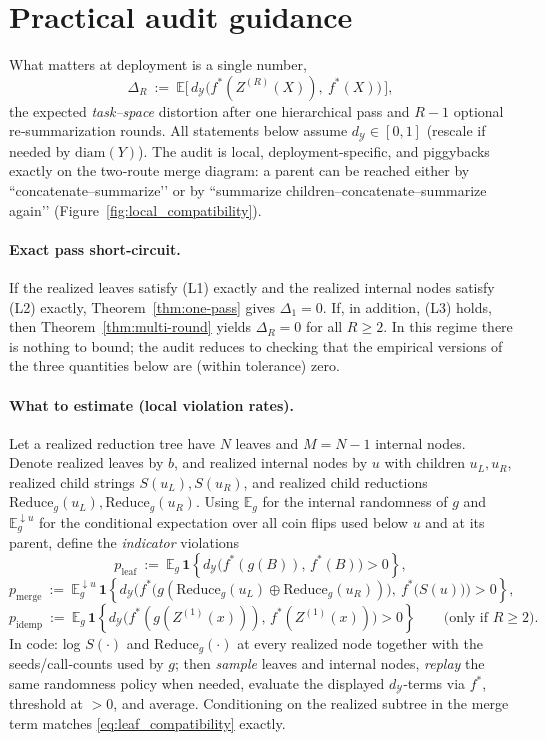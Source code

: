 \documentclass[11pt]{article}
\newcommand{\Y}{\mathcal{Y}}               %
\newcommand{\fstar}{f^*}               %
\newcommand{\E}{\mathbb{E}}
\newcommand{\concat}{\oplus}                    %
\newcommand{\metric}{d_{\Y}}
\newcommand{\reduce}{\text{Reduce}}
\newcommand{\reduceg}{\reduce_g}
\newcommand{\Eg}{\E_g}     %
\begin{document}
\section{Practical audit guidance}\label{sec:audit}

What matters at deployment is a single number,
\[
\Delta_R\ :=\ \E\Big[\,\metric\big(\fstar(Z^{(R)}(X)),\ \fstar(X)\big)\,\Big],
\]
the expected \emph{task–space} distortion after one hierarchical pass and $R-1$ optional
re‑summarization rounds. All statements below assume $\metric\in[0,1]$ (rescale if needed by
$\mathrm{diam}(Y)$). The audit is local, deployment‑specific, and piggybacks exactly on the two‑route
merge diagram: a parent can be reached either by “concatenate–summarize’’ or by “summarize
children–concatenate–summarize again’’ (Figure~\ref{fig:local_compatibility}).%

\paragraph{Exact pass short‑circuit.}
If the realized leaves satisfy \textnormal{(L1)} exactly and the realized internal nodes satisfy
\textnormal{(L2)} exactly, Theorem~\ref{thm:one-pass} gives $\Delta_1=0$. If, in addition, \textnormal{(L3)}
holds, then Theorem~\ref{thm:multi-round} yields $\Delta_R=0$ for all $R\ge2$. In this regime there is
nothing to bound; the audit reduces to checking that the empirical versions of the three quantities
below are (within tolerance) zero.

\paragraph{What to estimate (local violation rates).}
Let a realized reduction tree have $N$ leaves and $M=N-1$ internal nodes. Denote realized
leaves by $b$, and realized internal nodes by $u$ with children $u_L,u_R$, realized child strings
$S(u_L),S(u_R)$, and realized child reductions $\reduceg(u_L),\reduceg(u_R)$. Using $\Eg$ for the
internal randomness of $g$ and $\Eg^{\downarrow u}$ for the conditional expectation over all coin
flips used below $u$ and at its parent, define the \emph{indicator} violations
\[
p_{\mathrm{leaf}}\ :=\ \Eg\,\mathbf{1}\!\left\{\metric\!\big(\fstar(g(B)),\,\fstar(B)\big)>0\right\},
\]
\[
p_{\mathrm{merge}}\ :=\ \Eg^{\downarrow u}\,\mathbf{1}\!\left\{\metric\!\Big(\fstar\!\big(g(\reduceg(u_L)\concat \reduceg(u_R))\big),\ \fstar\!\big(S(u)\big)\Big)>0\right\},
\]
\[
p_{\mathrm{idemp}}\ :=\ \Eg\,\mathbf{1}\!\left\{\metric\!\big(\fstar(g(Z^{(1)}(x))),\,\fstar(Z^{(1)}(x))\big)>0\right\}\qquad\text{(only if $R\ge2$).}
\]
In code: log $S(\cdot)$ and $\reduceg(\cdot)$ at every realized node together with the seeds/call‑counts
used by $g$; then \emph{sample} leaves and internal nodes, \emph{replay} the same randomness policy when
needed, evaluate the displayed $\metric$‑terms via $\fstar$, threshold at $>0$, and average. Conditioning
on the realized subtree in the merge term matches \eqref{eq:leaf_compatibility} exactly.
\end{document}
